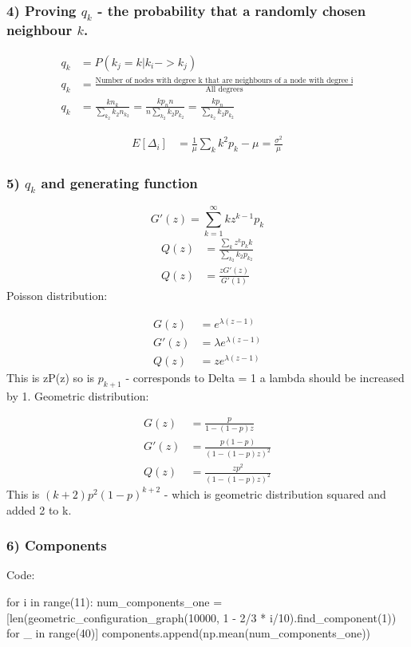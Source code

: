 \documentclass[a4paper, 11pt, oneside]{report}
\begin{document}
\subsubsection*{4) Proving $q_k$ - the probability that a randomly chosen neighbour $k$.}

\begin{align}
    q_k &= P(k_j = k| k_i -> k_j) \\
    q_k &= \frac{\text{Number of nodes with degree k that are neighbours of a node with degree i}}{\text{All degrees}} \\
    q_k &= \frac{kn_k}{\sum_{k_2} k_2n_{k_2}} = \frac{k p_n n}{n \sum_{k_2} k_2 p_{k_2}} = \frac{k p_n}{\sum_{k_2} k_2 p_{k_2}}
\end{align}

\begin{align}
    E[\Delta_i] &= \frac{1}{\mu} \sum_{k} k^2 p_k - \mu = \frac{\sigma^2}{\mu} 
\end{align}

\subsubsection*{5) $q_k$ and generating function}
$$G'(z) = \sum^{\infty}_{k=1}kz^{k-1}p_k$$
\begin{align}
    Q(z) &= \frac{\sum_k z^k p_k k}{\sum_{k_2}k_2p_{k_2}} \\
    Q(z) &= \frac{zG'(z)}{G'(1)} 
\end{align}
Poisson distribution:

\begin{align}
    G(z) &= e^{\lambda(z-1)} \\
    G'(z) &= \lambda e^{\lambda(z-1)} \\
    Q(z) &= ze^{\lambda(z-1)} 
\end{align}
This is zP(z) so is $p_{k+1}$ - corresponds to Delta = 1 a lambda should be increased by 1.
Geometric distribution:

\begin{align}
    G(z) &= \frac{p}{1-(1-p)z} \\
    G'(z) &= \frac{p(1-p)}{(1-(1-p)z)^2} \\
    Q(z) &= \frac{zp^2}{(1-(1-p)z)^2} 
\end{align}
This is $(k+2)p^2(1-p)^{k+2}$ - which is geometric distribution squared and added 2 to k.

\subsubsection*{6) Components}
Code:
\begin{verbnobox}[\fontsize{8pt}{8pt}\selectfont]
    for i in range(11):
        num_components_one = [len(geometric_configuration_graph(10000, 1 - 2/3 * i/10).find_component(1)) for _ in range(40)]
        components.append(np.mean(num_components_one))
\end{verbnobox}
\end{document}
